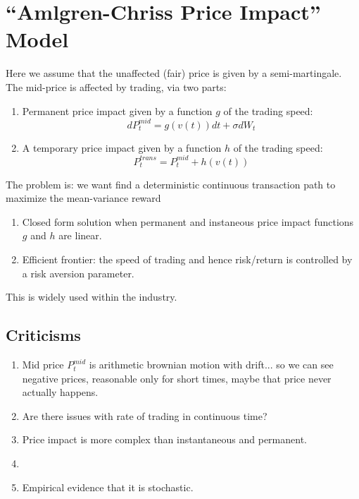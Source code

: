 \section{``Amlgren-Chriss Price Impact'' Model}
Here we assume that the unaffected (fair) price is given by a semi-martingale.
The mid-price is affected by trading, via two parts:
\begin{enumerate}
	\item Permanent price impact given by a function $g$ of the trading speed:
	\begin{equation}
		dP_t^{mid} = g(v(t))dt + \sigma dW_t
	\end{equation}
	
	\item A temporary price impact given by a function $h$ of the trading speed:
	\begin{equation}
		P^{trans}_t = P^{mid}_t + h(v(t))
	\end{equation}
\end{enumerate}

The problem is: we want find a deterministic continuous transaction path to maximize the mean-variance reward
\begin{enumerate}
	\item Closed form solution when permanent and instaneous price impact functions $g$ and $h$ are linear.
	\item Efficient frontier: the speed of trading and hence risk/return is controlled by a risk aversion parameter.
\end{enumerate}

This is widely used within the industry.

\subsection{Criticisms}
\begin{enumerate}
	\item Mid price $P_t^{mid}$ is arithmetic brownian motion with drift... so we can see negative prices, reasonable only for short times, maybe that price never actually happens.
	
	\item Are there issues with rate of trading in continuous time?
	
	\item Price impact is more complex than instantaneous and permanent. 
	
	\item 
	
	\item Empirical evidence that it is stochastic.
\end{enumerate}


